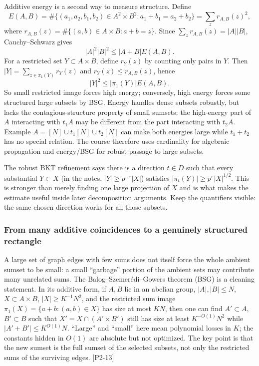 Additive energy is a second way to measure structure. Define \[
E(A,B)=\#\{(a_1,a_2,b_1,b_2)\in A^2\times B^2:a_1+b_1=a_2+b_2\}
=\sum_z r_{A,B}(z)^2,
\] where \(r_{A,B}(z)=\#\{(a,b)\in A\times B:a+b=z\}\). Since \(\sum_zr_{A,B}(z)=|A||B|\), Cauchy--Schwarz gives \[
|A|^2|B|^2\le |A+B|E(A,B).
\] For a restricted set \(Y\subset A\times B\), define \(r_Y(z)\) by counting only pairs in \(Y\). Then \(|Y|=\sum_{z\in\pi_1(Y)}r_Y(z)\) and \(r_Y(z)\le r_{A,B}(z)\), hence \[
|Y|^2\le |\pi_1(Y)|E(A,B).
\] So small restricted image forces high energy; conversely, high energy forces some structured large subsets by BSG. Energy handles dense subsets robustly, but lacks the contagious-structure property of small sumsets: the high-energy part of \(A\) interacting with \(t_1A\) may be different from the part interacting with \(t_2A\). Example \(A=[N]\cup t_1[N]\cup t_2[N]\) can make both energies large while \(t_1+t_2\) has no special relation. The course therefore uses cardinality for algebraic propagation and energy/BSG for robust passage to large subsets.

The robust BKT refinement says there is a direction \(t\in D\) such that every substantial \(Y\subset X\) (in the notes, \(|Y|\ge p^{-\varepsilon}|X|\)) satisfies \(|\pi_t(Y)|\ge p^{\varepsilon}|X|^{1/2}\). This is stronger than merely finding one large projection of \(X\) and is what makes the estimate useful inside later decomposition arguments. Keep the quantifiers visible: the same chosen direction works for all those subsets.

\subsubsection{From many additive coincidences to a genuinely structured rectangle}\label{04-visual-computing-ii-ch033-from-many-additive-coincidences-to-a-genuinely-structured-rectangle}

A large set of graph edges with few sums does not itself force the whole ambient sumset to be small: a small ``garbage'' portion of the ambient sets may contribute many unrelated sums. The Balog--Szemerédi--Gowers theorem (BSG) is a cleaning statement. In its additive form, if \(A,B\) lie in an abelian group, \(|A|,|B|\le N\), \(X\subset A\times B\), \(|X|\ge K^{-1}N^2\), and the restricted sum image \(\pi_1(X)=\{a+b:(a,b)\in X\}\) has size at most \(KN\), then one can find \(A'\subset A\), \(B'\subset B\) such that \(X'=X\cap(A'\times B')\) still has size at least \(K^{-O(1)}N^2\) while \(|A'+B'|\le K^{O(1)}N\). ``Large'' and ``small'' here mean polynomial losses in \(K\); the constants hidden in \(O(1)\) are absolute but not optimized. The key point is that the new sumset is the full sumset of the selected subsets, not only the restricted sums of the surviving edges. {[}P2-13{]}

